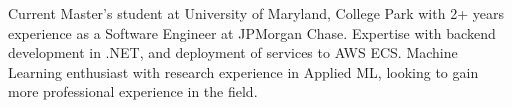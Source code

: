 
\begin{cvparagraph}

Current Master's student at University of Maryland, College Park with 2+ years experience as a Software Engineer at JPMorgan Chase. Expertise with backend development in .NET, and deployment of services to AWS ECS. Machine Learning enthusiast with research experience in Applied ML, looking to gain more professional experience in the field.

\end{cvparagraph}
